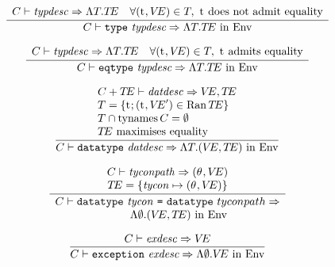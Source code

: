 \begin{equation}        %
\label{typespec-rule}
\frac{\begin{array}{lr}
       \C\ts\typdesc\ra\LAMBDA{\T}{\TE} &
       \forall(\t,\VE)\in T,\ \mbox{\t\ does not admit equality}
      \end{array}}
     { \C\ts\typespec\ra\LAMBDA{\T}{\TE\ \In\ \Env}}
\end{equation}

\begin{equation}        %
\label{eqtypspec-rule}
\frac{\begin{array}{lr}
       \C\ts\typdesc\ra\LAMBDA{\T}{\TE} &
       \forall(\t,\VE)\in T,\ \mbox{\t\ admits equality}
      \end{array}}
     { \C\ts\eqtypespec\ra\LAMBDA{\T}{\TE\ \In\ \Env}}
\end{equation}

\begin{equation}        %
\label{datatypespec-rule}
\frac{\begin{array}{l}
      \C + \TE\ts\datdesc\ra\VE,\TE \\
      \T = \{\t; (\t, \VE') \in\Ran\TE\} \\
      \T \cap \TyNamesFcn \C = \emptyset \\
      \mbox{$\TE$ maximises equality}
     \end{array}
     }
     {\C\ts\datatypespec\ra\LAMBDA{\T}{(\VE,\TE)\ \In\ \Env}}
\end{equation}

\begin{equation}	%
\label{datatyperepspec-rule}
\frac{\begin{array}{c}
      \C\ts\tyconpath\ra(\typefnc,\VE) \\
      \TE = \{ \tycon\mapsto(\typefnc,\VE)\}
     \end{array}
     }
     {\begin{array}{c}
        \C\ts\datatyperepspec\ra\\
         \qquad\LAMBDA{\emptyset}{(\VE,\TE)\ \In\ \Env}
      \end{array}}
\end{equation}



\begin{equation}        %
\label{exceptionspec-rule}
\frac{ \C\ts\exndesc\ra\VE}
     { \C\ts\exceptionspec\ra\LAMBDA{\emptyset}{\VE\ \In\ \Env }}
\end{equation}

